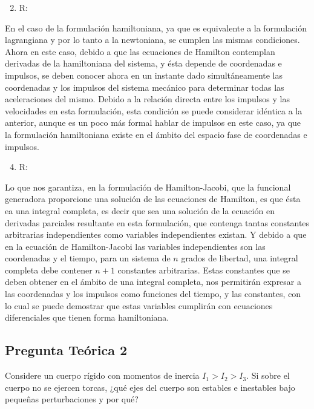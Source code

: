 \documentclass[a4paper,10pt]{article}
\numberwithin{equation}{section}
\begin{document}
\begin{enumerate}[label=\alph*)]
  \setcounter{enumi}{1}
 \item R:
\end{enumerate}

En el caso de la formulación hamiltoniana, ya que es equivalente a la formulación 
lagrangiana y por lo tanto a la newtoniana, se cumplen las mismas condiciones. Ahora 
en este caso, debido a que las ecuaciones de Hamilton contemplan derivadas de la 
hamiltoniana del sistema, y ésta depende de coordenadas e impulsos, se deben conocer 
ahora en un instante dado simultáneamente las coordenadas y los impulsos del sistema 
mecánico para determinar todas las aceleraciones del mismo. Debido a la relación 
directa entre los impulsos y las velocidades en esta formulación, esta condición 
se puede considerar idéntica a la anterior, aunque es un poco más formal hablar de 
impulsos en este caso, ya que la formulación hamiltoniana existe en el ámbito del 
espacio fase de coordenadas e impulsos.

\begin{enumerate}[label=\alph*)]
  \setcounter{enumi}{3}
 \item R:
\end{enumerate}

Lo que nos garantiza, en la formulación de Hamilton-Jacobi, que la funcional generadora 
proporcione una solución de las ecuaciones de Hamilton, es que ésta ea una integral 
completa, es decir que sea una solución de la ecuación en derivadas parciales resultante 
en esta formulación, que contenga tantas constantes arbitrarias independientes como 
variables independientes existan. Y debido a que en la ecuación de Hamilton-Jacobi 
las variables independientes son las coordenadas y el tiempo, para un sistema de 
$n$ grados de libertad, una integral completa debe contener $n+1$ constantes arbitrarias. 
Estas constantes que se deben obtener en el ámbito de una integral completa, nos permitirán 
expresar a las coordenadas y los impulsos como funciones del tiempo, y las constantes, 
con lo cual se puede demostrar que estas variables cumplirán con ecuaciones 
diferenciales que tienen forma hamiltoniana.

\subsection{Pregunta Teórica 2}

Considere un cuerpo rígido con momentos de inercia $I_1 > I_2 > I_3$. Si sobre el cuerpo no se 
ejercen torcas, ¿qué ejes del cuerpo son estables e inestables bajo pequeñas perturbaciones y 
por qué?
\end{document}
